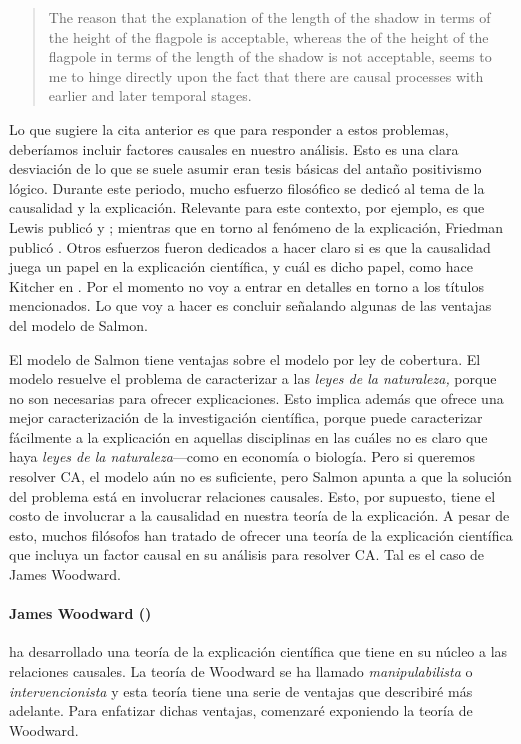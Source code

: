	\begin{quote}
    The reason that the explanation of the length of the
    shadow in terms of the height of the flagpole is
    acceptable, whereas the  of the height
    of the flagpole in terms of the length of the shadow is
    not acceptable, seems to me to hinge directly upon the
    fact that there are causal processes with earlier and
    later temporal stages. \parencite[p.~72]{Salmon1970}
	\end{quote}
  
Lo que sugiere la cita anterior es que para responder a
estos problemas, deberíamos incluir factores causales en
nuestro análisis. Esto es una clara desviación de lo que se
suele asumir eran tesis básicas del antaño positivismo
lógico. Durante este periodo, mucho esfuerzo filosófico se
dedicó al tema de la causalidad y la explicación. Relevante
para este contexto, por ejemplo, es que Lewis publicó
 y ; mientras
que en torno al fenómeno de la explicación, Friedman publicó
. Otros esfuerzos fueron dedicados a
hacer claro si es que la causalidad juega un papel en la
explicación científica, y cuál es dicho papel, como hace
Kitcher en . Por el momento no voy a
entrar en detalles en torno a los títulos mencionados. Lo
que voy a hacer es concluir señalando algunas de las
ventajas del modelo de Salmon.

El modelo de Salmon tiene ventajas sobre el modelo por ley
de cobertura. El modelo resuelve el problema de caracterizar
a las \emph{leyes de la naturaleza,} porque no son
necesarias para ofrecer explicaciones. Esto implica además
que ofrece una mejor caracterización de la investigación
científica, porque puede caracterizar fácilmente a la
explicación en aquellas disciplinas en las cuáles no es
claro que haya \emph{leyes de la naturaleza}---como en
economía o biología. Pero si queremos resolver CA, el modelo
aún no es suficiente, pero Salmon apunta a que la solución
del problema está en involucrar relaciones causales. Esto,
por supuesto, tiene el costo de involucrar a la causalidad
en nuestra teoría de la explicación. A pesar de esto, muchos
filósofos han tratado de ofrecer una teoría de la
explicación científica que incluya un factor causal en su
análisis para resolver CA. Tal es el caso de James
Woodward.

\paragraph{James Woodward (\citeyear{Woodward2004})} 
ha desarrollado una teoría de la explicación científica que
tiene en su núcleo a las relaciones causales. La
teoría de Woodward se ha llamado \emph{manipulabilista} o
\emph{intervencionista} y esta teoría tiene una serie de ventajas que describiré más
adelante. Para enfatizar dichas ventajas, comenzaré
exponiendo la teoría de Woodward. 

